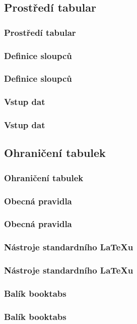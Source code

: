 \subsection{Prostředí tabular}
\begin{frame}
	\frametitle{Prostředí tabular}
\end{frame}


\subsubsection{Definice sloupců}
\begin{frame}
	\frametitle{Definice sloupců}
\end{frame}


\subsubsection{Vstup dat}
\begin{frame}
	\frametitle{Vstup dat}
\end{frame}


\subsection{Ohraničení tabulek}
\begin{frame}
	\frametitle{Ohraničení tabulek}
\end{frame}


\subsubsection{Obecná pravidla}
\begin{frame}
	\frametitle{Obecná pravidla}
\end{frame}


\subsubsection{Nástroje standardního \LaTeX{}u}
\begin{frame}
	\frametitle{Nástroje standardního \LaTeX{}u}
\end{frame}


\subsubsection{Balík booktabs}
\begin{frame}
	\frametitle{Balík booktabs}
\end{frame}


